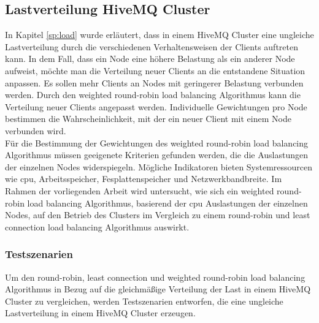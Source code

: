 \subsection{Lastverteilung HiveMQ Cluster} \label{ss:load-distribution}
In Kapitel \ref{sp:load} wurde erläutert, dass in einem HiveMQ Cluster eine ungleiche Lastverteilung durch die verschiedenen Verhaltensweisen der Clients auftreten kann.
In dem Fall, dass ein Node eine höhere Belastung als ein anderer Node aufweist, möchte man die Verteilung neuer Clients an die entstandene Situation anpassen. Es sollen mehr Clients an Nodes mit geringerer Belastung verbunden werden.
Durch den weighted round-robin load balancing Algorithmus kann die Verteilung neuer Clients angepasst werden. Individuelle Gewichtungen pro Node bestimmen die Wahrscheinlichkeit, mit der ein neuer Client mit einem Node verbunden wird.
\\
Für die Bestimmung der Gewichtungen des weighted round-robin load balancing Algorithmus müssen geeigenete Kriterien gefunden werden, die die Auslastungen der einzelnen Nodes widerspiegeln.
Mögliche Indikatoren bieten Systemressourcen wie \ac{cpu}, Arbeitsspeicher, Fesplattenspeicher und Netzwerkbandbreite.
Im Rahmen der vorliegenden Arbeit wird untersucht, wie sich ein weighted round-robin load balancing Algorithmus, basierend der \ac{cpu} Auslastungen der einzelnen Nodes, auf den Betrieb des Clusters im Vergleich zu einem round-robin und least connection load balancing Algorithmus auswirkt.

\subsubsection{Testszenarien} \label{ss:test}
Um den round-robin, least connection und weighted round-robin load balancing Algorithmus in Bezug auf die gleichmä{\ss}ige Verteilung der Last in einem HiveMQ Cluster zu vergleichen, werden Testszenarien entworfen, die eine ungleiche Lastverteilung in einem HiveMQ Cluster erzeugen.

